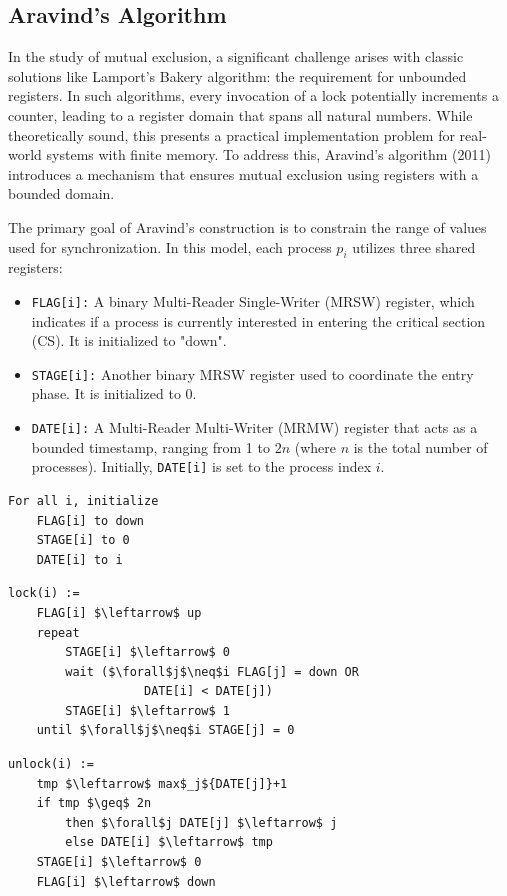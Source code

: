 \subsection{Aravind’s Algorithm}
In the study of mutual exclusion, a significant challenge arises with classic solutions like Lamport’s Bakery algorithm: the requirement for unbounded registers. In such algorithms, every invocation of a lock potentially increments a counter, leading to a register domain that spans all natural numbers. While theoretically sound, this presents a practical implementation problem for real-world systems with finite memory. To address this, Aravind’s algorithm (2011) introduces a mechanism that ensures mutual exclusion using registers with a bounded domain.

The primary goal of Aravind's construction is to constrain the range of values used for synchronization. In this model, each process $p_i$ utilizes three shared registers:
\begin{itemize}
    \item \texttt{FLAG[i]:} A binary Multi-Reader Single-Writer (MRSW) register, which indicates if a process is currently interested in entering the critical section (CS). It is initialized to "down".
    \item \texttt{STAGE[i]:} Another binary MRSW register used to coordinate the entry phase. It is initialized to 0. 
    \item \texttt{DATE[i]:} A Multi-Reader Multi-Writer (MRMW) register that acts as a bounded timestamp, ranging from 1 to $2n$ (where $n$ is the total number of processes). Initially, \texttt{DATE[i]} is set to the process index $i$.
\end{itemize}

\begin{minipage}{\textwidth}
\begin{lstlisting}[mathescape]
For all i, initialize
    FLAG[i] to down
    STAGE[i] to 0
    DATE[i] to i
\end{lstlisting}
\begin{minipage}{0.45\textwidth}
\begin{lstlisting}[mathescape]
lock(i) :=
    FLAG[i] $\leftarrow$ up
    repeat
        STAGE[i] $\leftarrow$ 0
        wait ($\forall$j$\neq$i FLAG[j] = down OR
                   DATE[i] < DATE[j])
        STAGE[i] $\leftarrow$ 1
    until $\forall$j$\neq$i STAGE[j] = 0
\end{lstlisting}
\end{minipage}
\hfill
\begin{minipage}{0.45\textwidth}
\begin{lstlisting}[mathescape]
unlock(i) :=
    tmp $\leftarrow$ max$_j${DATE[j]}+1
    if tmp $\geq$ 2n
        then $\forall$j DATE[j] $\leftarrow$ j
        else DATE[i] $\leftarrow$ tmp
    STAGE[i] $\leftarrow$ 0
    FLAG[i] $\leftarrow$ down
\end{lstlisting}
\end{minipage}
\end{minipage}\\

